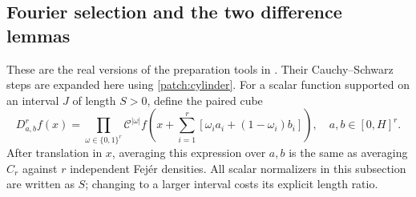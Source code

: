 \documentclass[11pt]{article}
\theoremstyle{definition}
\begin{document}
\subsection{Fourier selection and the two difference lemmas}\label{patch:auxiliary-differences}
These are the real versions of the preparation tools in \cite[\S4.5.1]{KoszEtAl}.
Their Cauchy--Schwarz steps are expanded here using \cref{patch:cylinder}.
For a scalar function supported on an interval $J$ of length $S>0$, define the paired cube
\[
 D_{a,b}^{r}f(x)=\prod_{\omega\in\{0,1\}^r}\mathcal C^{|\omega|}
       f\left(x+\sum_{i=1}^r[\omega_i a_i+(1-\omega_i)b_i]\right),
 \quad a,b\in[0,H]^r.
\]
After translation in $x$, averaging this expression over $a,b$ is the same as averaging
$C_r$ against $r$ independent Fej\'er densities.  All scalar normalizers in this subsection
are written as $S$; changing to a larger interval costs its explicit length ratio.
\end{document}
